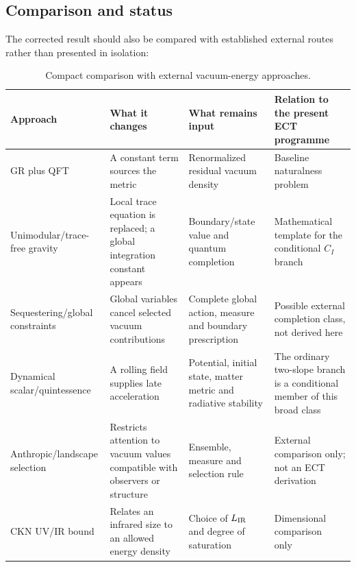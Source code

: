 \subsection{Comparison and status}
\label{subsec:comparison_cc}

The corrected result should also be compared with established external
routes rather than presented in isolation:

{\small
\setlength{\tabcolsep}{4.5pt}
\setlength{\LTpre}{0pt}
\setlength{\LTpost}{0pt}
\renewcommand{\arraystretch}{0.98}
\begin{longtable}{p{3.0cm}p{4.0cm}p{3.5cm}p{}}
\caption{Compact comparison with external vacuum-energy approaches.}
\label{tab:cc_external_approaches}\\
\toprule
\textbf{Approach} & \textbf{What it changes} & \textbf{What remains input}
& \textbf{Relation to the present ECT programme}\\
\midrule
GR plus QFT & A constant term sources the metric & Renormalized residual
vacuum density & Baseline naturalness problem~\cite{Weinberg1989}\\
Unimodular/trace-free gravity & Local trace equation is replaced; a global
integration constant appears & Boundary/state value and quantum completion
& Mathematical template for the conditional $C_I$ branch
~\cite{HenneauxTeitelboim1989}\\
Sequestering/global constraints & Global variables cancel selected vacuum
contributions & Complete global action, measure and boundary prescription
& Possible external completion class, not derived here\\
Dynamical scalar/quintessence & A rolling field supplies late acceleration
& Potential, initial state, matter metric and radiative stability & The
ordinary two-slope branch is a conditional member of this broad class\\
Anthropic/landscape selection & Restricts attention to vacuum values
compatible with observers or structure & Ensemble, measure and selection
rule & External comparison only; not an ECT derivation
~\cite{Weinberg1987}\\
CKN UV/IR bound & Relates an infrared size to an allowed energy density
& Choice of $L_{\rm IR}$ and degree of saturation & Dimensional comparison
only~\cite{CohenKaplanNelson1999}\\
\bottomrule
\end{longtable}}

